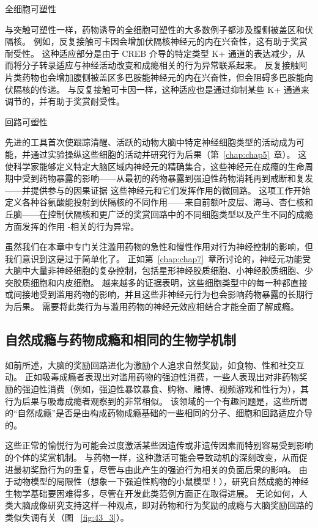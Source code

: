 全细胞可塑性

与突触可塑性一样，药物诱导的全细胞可塑性的大多数例子都涉及腹侧被盖区和伏隔核。
例如，反复接触可卡因会增加伏隔核神经元的内在兴奋性，这有助于奖赏耐受性。
这种适应部分是由于 CREB 介导的特定类型 K+ 通道的表达减少，从而将分子转录适应与神经活动改变和成瘾相关的行为异常联系起来。
反复接触阿片类药物也会增加腹侧被盖区多巴胺能神经元的内在兴奋性，但会阻碍多巴胺能向伏隔核的传递。
与反复接触可卡因一样，这种适应也是通过抑制某些 K+ 通道来调节的，并有助于奖赏耐受性。


回路可塑性

先进的工具首次使跟踪清醒、活跃的动物大脑中特定神经细胞类型的活动成为可能，并通过实验操纵这些细胞的活动并研究行为后果（第~\ref{chap:chap5}~章）。
这使科学家能够定义特定大脑区域内神经元的精确集合，这些神经元在成瘾的生命周期中受到药物暴露的影响——从最初的药物暴露到强迫性药物消耗再到戒断和复发——并提供参与的因果证据 这些神经元和它们发挥作用的微回路。
这项工作开始定义各种谷氨酸能投射到伏隔核的不同作用——来自前额叶皮层、海马、杏仁核和丘脑——在控制伏隔核和更广泛的奖赏回路中的不同细胞类型以及产生不同的成瘾方面发挥的作用 -相关的行为异常。


虽然我们在本章中专门关注滥用药物的急性和慢性作用对行为神经控制的影响，但我们意识到这是过于简单化了。
正如第~\ref{chap:chap7}~章所讨论的，神经元功能受大脑中大量非神经细胞的复杂控制，包括星形神经胶质细胞、小神经胶质细胞、少突胶质细胞和内皮细胞。
越来越多的证据表明，这些细胞类型中的每一种都直接或间接地受到滥用药物的影响，并且这些非神经元行为也会影响药物暴露的长期行为后果。
需要将此类行为与滥用药物的神经元效应相结合才能全面了解成瘾。



\subsection{自然成瘾与药物成瘾和相同的生物学机制}

如前所述，大脑的奖励回路进化为激励个人追求自然奖励，如食物、性和社交互动。
正如吸毒成瘾者表现出对滥用药物的强迫性消费，一些人表现出对非药物奖励的强迫性消费（例如，强迫性暴饮暴食、购物、赌博、视频游戏和性行为），其行为后果与吸毒成瘾者观察到的非常相似。
该领域的一个有趣问题是，这些所谓的“自然成瘾”是否是由构成药物成瘾基础的一些相同的分子、细胞和回路适应介导的。


这些正常的愉悦行为可能会过度激活某些因遗传或非遗传因素而特别容易受到影响的个体的奖赏机制。
与药物一样，这种激活可能会导致动机的深刻改变，从而促进最初奖励行为的重复，尽管与由此产生的强迫行为相关的负面后果的影响。
由于动物模型的局限性（想象一下强迫性购物的小鼠模型！），研究自然成瘾的神经生物学基础要困难得多，尽管在开发此类范例方面正在取得进展。
无论如何，人类大脑成像研究支持这样一种观点，即对药物和行为奖励的成瘾与大脑奖励回路的类似失调有关（图 ~\ref{fig:43_3}）。



